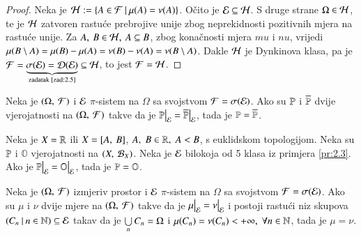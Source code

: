 \begin{proof}
    Neka je $\mathcal{H} := \{{A \in \mathcal{F}} \: | \: {\mu({A}) = \nu(A)}\}$.
    O\v cito je $\mathcal{E} \subseteq \mathcal{H}$. S druge strane $\Omega \in \mathcal{H}$,
    te je $\mathcal{H}$ zatvoren rastu\' ce prebrojive unije zbog
    neprekidnosti pozitivnih mjera na rastu\' ce unije.
    Za $A, \: B \in \mathcal{H}, \: A \subseteq B$, zbog kona\v cnosti mjera
    $mu$ i $nu$, vrijedi $\mu({B \setminus A}) = \mu({B})
    - \mu({A}) = \nu(B) - \nu(A) = \nu(B \setminus A)$.
    Dakle $\mathcal{H}$ je Dynkinova klasa, pa je $\mathcal{F} = \underbrace{
    \sigma({\mathcal{E}}) = \mathcal{D}({\mathcal{E}})}_{\textnormal{zadatak \ref{zad:2.5}}}
    \subseteq \mathcal{H}$, to jest $\mathcal{F} = \mathcal{H}$.
\end{proof}

\begin{kor} \label{kor:2.7}
    Neka je $(\Omega, \: \mathcal{F})$ i $\mathcal{E}$ $\pi$-sistem na $\Omega$ sa
    svojstvom $\mathcal{F} = \sigma({\mathcal{E}})$. Ako su $\mathbb{P}$ i $\overline{\mathbb{P}}$
    dvije vjerojatnosti na $(\Omega, \: \mathcal{F})$ takve da je
    $\restr{\Pp}{\E} = \restr{\overline{\Pp}}{\E}$, tada je $\mathbb{P}
    = \overline{\mathbb{P}}$.
\end{kor}

\begin{kor} \label{kor:2.8}
    Neka je $X = \mathbb{R}$ ili $X = [{A}, \:{B}]$, $A, \; B \in \mathbb{R}, \; A < B$, s euklidskom topologijom.
    Neka su $\mathbb{P}$ i $\mathbb{O}$ vjerojatnosti na $({X}, \: {\mathcal{B}_{X}})$.
    Neka je $\mathcal{E}$ bilokoja od 5 klasa iz primjera \ref{pr:2.3}.
    Ako je $\restr{\masP}{\famE} = \restr{\mathbb{O}}{\famE}$, tada je $\mathbb{P} = \mathbb{O}$.
\end{kor}

\begin{zad} \label{zad:2.9}
    Neka je $(\Omega, \: \mathcal{F})$ izmjeriv prostor i $\mathcal{E}$ $\pi$-sistem
    na $\Omega$ sa svojstvom $\mathcal{F} = \sigma({\mathcal{E}})$.
    Ako su $\mu$ i $\nu$ dvije mjere na $(\Omega, \: \mathcal{F})$ takve
    da je $\restr{\mu}{\E} = \restr{\nu}{\E}$ i postoji rastu\' ci
    niz skupova $({C_n} \: | \: {n \in \mathbb{N}}) \subseteq \mathcal{E}$ takav da je
    $\bigcup\limits_{n}^{}C_n = \Omega$ i $\mu({C_n}) = \nu(C_n) < +\infty, \;
    \forall n \in \mathbb{N}$, tada je $\mu = \nu$.
\end{zad}

